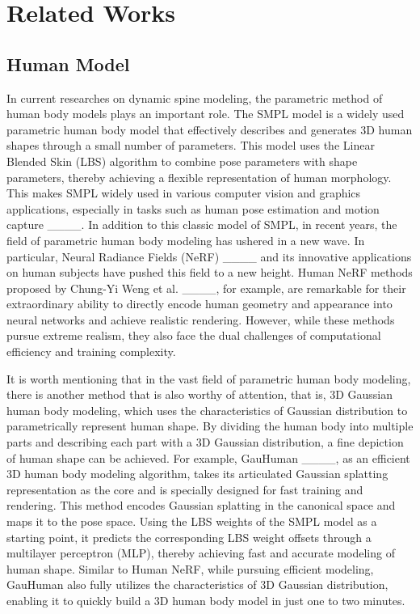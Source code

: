 \section{Related Works}
\label{Sec:related}
\subsection{Human Model}
In current researches on dynamic spine modeling, the parametric method of human body models plays an important role. The SMPL model is a widely used parametric human body model that effectively describes and generates 3D human shapes through a small number of parameters. This model uses the Linear Blended Skin (LBS) algorithm to combine pose parameters with shape parameters, thereby achieving a flexible representation of human morphology. This makes SMPL widely used in various computer vision and graphics applications, especially in tasks such as human pose estimation and motion capture ____.
In addition to this classic model of SMPL, in recent years, the field of parametric human body modeling has ushered in a new wave. In particular, Neural Radiance Fields (NeRF) ____ and its innovative applications on human subjects have pushed this field to a new height. Human NeRF methods proposed by Chung-Yi Weng et al. ____, for example, are remarkable for their extraordinary ability to directly encode human geometry and appearance into neural networks and achieve realistic rendering. However, while these methods pursue extreme realism, they also face the dual challenges of computational efficiency and training complexity.
\par It is worth mentioning that in the vast field of parametric human body modeling, there is another method that is also worthy of attention, that is, 3D Gaussian human body modeling, which uses the characteristics of Gaussian distribution to parametrically represent human shape. By dividing the human body into multiple parts and describing each part with a 3D Gaussian distribution, a fine depiction of human shape can be achieved. For example, GauHuman ____, as an efficient 3D human body modeling algorithm, takes its articulated Gaussian splatting representation as the core and is specially designed for fast training and rendering. This method encodes Gaussian splatting in the canonical space and maps it to the pose space. Using the LBS weights of the SMPL model as a starting point, it predicts the corresponding LBS weight offsets through a multilayer perceptron (MLP), thereby achieving fast and accurate modeling of human shape. Similar to Human NeRF, while pursuing efficient modeling, GauHuman also fully utilizes the characteristics of 3D Gaussian distribution, enabling it to quickly build a 3D human body model in just one to two minutes.

